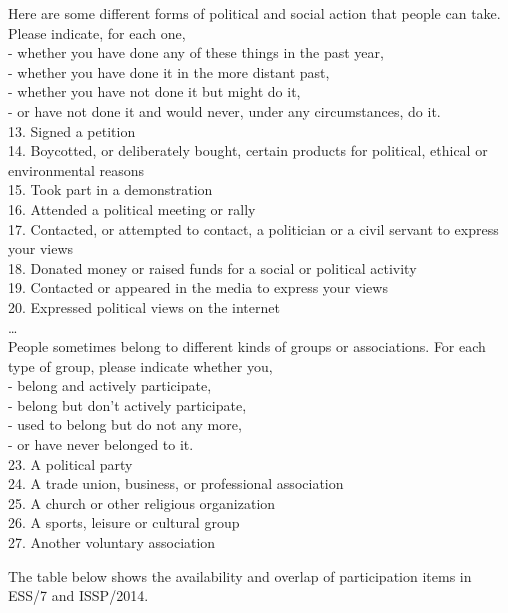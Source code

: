 \documentclass[12pt,]{article}
\begin{document}
Here are some different forms of political and social action that people can take. Please indicate, for each one,\\
- whether you have done any of these things in the past year,\\
- whether you have done it in the more distant past,\\
- whether you have not done it but might do it,\\
- or have not done it and would never, under any circumstances, do it.\\
13. Signed a petition\\
14. Boycotted, or deliberately bought, certain products for political, ethical or environmental reasons\\
15. Took part in a demonstration\\
16. Attended a political meeting or rally\\
17. Contacted, or attempted to contact, a politician or a civil servant to express your views\\
18. Donated money or raised funds for a social or political activity\\
19. Contacted or appeared in the media to express your views\\
20. Expressed political views on the internet\\
\ldots{}\\
People sometimes belong to different kinds of groups or associations. For each type of group, please indicate whether you,\\
- belong and actively participate,\\
- belong but don't actively participate,\\
- used to belong but do not any more,\\
- or have never belonged to it.\\
23. A political party\\
24. A trade union, business, or professional association\\
25. A church or other religious organization\\
26. A sports, leisure or cultural group\\
27. Another voluntary association

The table below shows the availability and overlap of participation items in ESS/7 and ISSP/2014.
\end{document}
